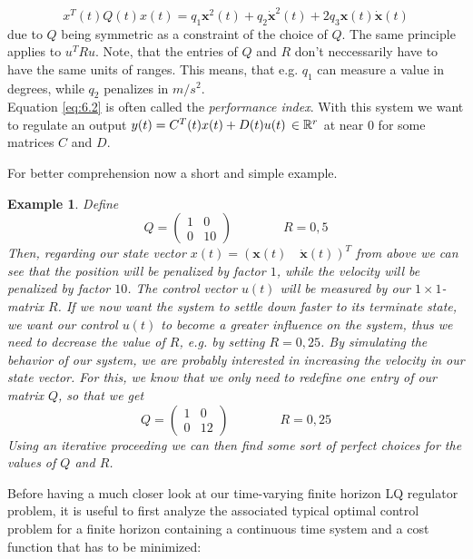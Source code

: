 \documentclass[paper=a4, pagesize, DIV=calc, BCOR=12.5mm, twoside=on, onecolumn=on, open = any, titlepage =on, parskip =half-, headsepline = on, footsepline = on, chapterprefix = on, appendixprefix = off, fontsize = 12pt, numbers = noenddot, abstract = on]{scrbook}
\numberwithin{equation}{chapter}
\theoremstyle{definition}
\theoremstyle{plain}
\newtheorem{beispiel}{Example}
\theoremstyle{plain}
\theoremstyle{remark}
\theoremstyle{plain}
\theoremstyle{plain}
\begin{document}
\[
x^T(t)Q(t)x(t) = q_1\mathbf{x}^2(t) + q_2\dot{\mathbf{x}}^2(t) + 2q_3\mathbf{x}(t)\dot{\mathbf{x}}(t)
\] due to $Q$ being symmetric as a constraint of the choice of $Q$. The same principle applies to $u^TRu$. Note, that the entries of $Q$ and $R$ don't neccessarily have to have the same units of ranges. This means, that e.g. $q_1$ can measure a value in degrees, while $q_2$ penalizes in $m/s^2$.\\ Equation \eqref{eq:6.2} is often called the \emph{performance index}. With this system we want to regulate an output $y(t) = C^T(t)x(t) + D(t)u(t)\, \in \mathbb{R}^r$ at near $0$ for some matrices $C$ and $D$. 

For better comprehension now a short and simple example.
\begin{beispiel}
Define \[
Q = \begin{pmatrix}
1 & 0\\
0 & 10
\end{pmatrix}
 \qquad \qquad R=0,5
\]
Then, regarding our state vector $x(t) = \left( \mathbf{x}(t) \quad \dot{\mathbf{x}}(t) \right)^T$ from above we can see that the position will be penalized by factor $1$, while the velocity will be penalized by factor $10$. The control vector $u(t)$ will be measured by our $1 \times 1$-matrix $R$. If we now want the system to settle down faster to its terminate state, we want our control $u(t)$ to become a greater influence on the system, thus we need to decrease the value of $R$, e.g. by setting $R=0,25$. By simulating the behavior of our system, we are probably interested in increasing the velocity in our state vector. For this, we know that we only need to redefine one entry of our matrix $Q$, so that we get
\[
Q = \begin{pmatrix}
1 & 0\\
0 & 12
\end{pmatrix}
\qquad \qquad R= 0,25
\]
Using an iterative proceeding we can then find some sort of perfect choices for the values of $Q$ and $R$.
\end{beispiel}
Before having a much closer look at our time-varying finite horizon LQ regulator problem, it is useful to first analyze the associated typical optimal control problem for a finite horizon containing a continuous time system and a cost function that has to be minimized:
\par\singlespacing
\end{document}
